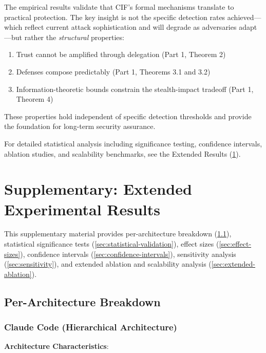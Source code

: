 \documentclass[
]{article}
\begin{document}
The empirical results validate that CIF's formal mechanisms translate to
practical protection. The key insight is not the specific detection
rates achieved---which reflect current attack sophistication and will
degrade as adversaries adapt---but rather the \textit{structural}
properties:

\begin{enumerate}
\item Trust cannot be amplified through delegation (Part 1, Theorem 2)
\item Defenses compose predictably (Part 1, Theorems 3.1 and 3.2)
\item Information-theoretic bounds constrain the stealth-impact tradeoff (Part 1, Theorem 4)
\end{enumerate}

These properties hold independent of specific detection thresholds and
provide the foundation for long-term security assurance.

For detailed statistical analysis including significance testing,
confidence intervals, ablation studies, and scalability benchmarks, see
the Extended Results (\cref{sec:extended-results}).

\newpage

\newpage

\section{Supplementary: Extended Experimental
Results}\label{sec:extended-results}

This supplementary material provides per-architecture breakdown
(\cref{sec:per-arch}), statistical significance tests
(\cref{sec:statistical-validation}), effect sizes
(\cref{sec:effect-sizes}), confidence intervals
(\cref{sec:confidence-intervals}), sensitivity analysis
(\cref{sec:sensitivity}), and extended ablation and scalability analysis
(\cref{sec:extended-ablation}).

\subsection{Per-Architecture Breakdown}\label{sec:per-arch}

\subsubsection{Claude Code (Hierarchical
Architecture)}\label{sec:claude-code}

\textbf{Architecture Characteristics}:
\end{document}
